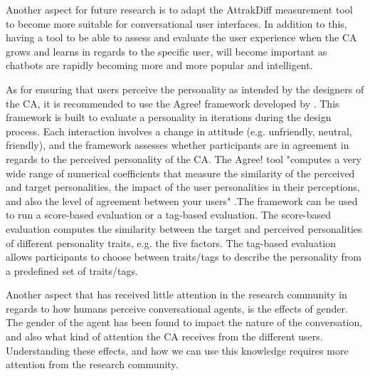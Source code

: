 Another aspect for future research is to adapt the AttrakDiff measurement tool to become more suitable for conversational user interfaces. In addition to this, having a tool to be able to assess and evaluate the user experience when the CA grows and learns in regards to the specific user, will become important as chatbots are rapidly becoming more and more popular and intelligent.

As for ensuring that users perceive the personality as intended by the designers of the CA, it is recommended to use the Agree! framework developed by \cite{Callejas2014}. This framework is built to evaluate a personality in iterations during the design process. Each interaction involves a change in attitude (e.g. unfriendly, neutral, friendly), and the framework assesses whether participants are in agreement in regards to the perceived personality of the CA. The Agree! tool "computes a very wide range of numerical coefficients that measure the similarity of the perceived and target personalities, the impact of the user personalities in their perceptions, and also the level of agreement between your users" \citep{Callejas2014}.The framework can be used to run a score-based evaluation or a tag-based evaluation. The score-based evaluation computes the similarity between the target and perceived personalities of different personality traits, e.g. the five factors. The tag-based evaluation allows participants to choose between traits/tags to describe the personality from a predefined set of traits/tags.

Another aspect that has received little attention in the research community in regards to how humans perceive conversational agents, is the effects of gender. The gender of the agent has been found to impact the nature of the conversation, and also what kind of attention the CA receives from the different users. Understanding these effects, and how we can use this knowledge requires more attention from the research community.

